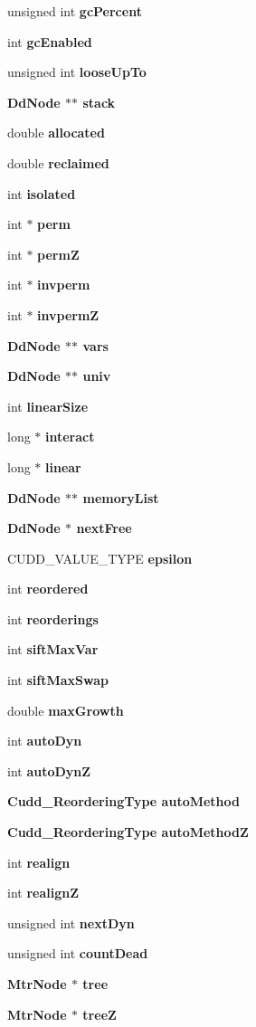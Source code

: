 \begin{CompactItemize}
\item 
unsigned int \bf{gc\-Percent}
\item 
int \bf{gc\-Enabled}
\item 
unsigned int \bf{loose\-Up\-To}
\item 
\bf{Dd\-Node} $\ast$$\ast$ \bf{stack}
\item 
double \bf{allocated}
\item 
double \bf{reclaimed}
\item 
int \bf{isolated}
\item 
int $\ast$ \bf{perm}
\item 
int $\ast$ \bf{perm\-Z}
\item 
int $\ast$ \bf{invperm}
\item 
int $\ast$ \bf{invperm\-Z}
\item 
\bf{Dd\-Node} $\ast$$\ast$ \bf{vars}
\item 
\bf{Dd\-Node} $\ast$$\ast$ \bf{univ}
\item 
int \bf{linear\-Size}
\item 
long $\ast$ \bf{interact}
\item 
long $\ast$ \bf{linear}
\item 
\bf{Dd\-Node} $\ast$$\ast$ \bf{memory\-List}
\item 
\bf{Dd\-Node} $\ast$ \bf{next\-Free}
\item 
CUDD\_\-VALUE\_\-TYPE \bf{epsilon}
\item 
int \bf{reordered}
\item 
int \bf{reorderings}
\item 
int \bf{sift\-Max\-Var}
\item 
int \bf{sift\-Max\-Swap}
\item 
double \bf{max\-Growth}
\item 
int \bf{auto\-Dyn}
\item 
int \bf{auto\-Dyn\-Z}
\item 
\bf{Cudd\_\-Reordering\-Type} \bf{auto\-Method}
\item 
\bf{Cudd\_\-Reordering\-Type} \bf{auto\-Method\-Z}
\item 
int \bf{realign}
\item 
int \bf{realign\-Z}
\item 
unsigned int \bf{next\-Dyn}
\item 
unsigned int \bf{count\-Dead}
\item 
\bf{Mtr\-Node} $\ast$ \bf{tree}
\item 
\bf{Mtr\-Node} $\ast$ \bf{tree\-Z}
\item 

\end{CompactItemize}
